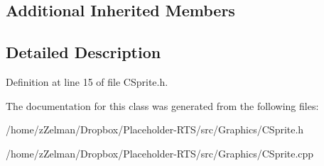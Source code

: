 \subsection*{Additional Inherited Members}


\subsection{Detailed Description}


Definition at line 15 of file C\-Sprite.\-h.



The documentation for this class was generated from the following files\-:\begin{DoxyCompactItemize}
\item 
/home/z\-Zelman/\-Dropbox/\-Placeholder-\/\-R\-T\-S/src/\-Graphics/C\-Sprite.\-h\item 
/home/z\-Zelman/\-Dropbox/\-Placeholder-\/\-R\-T\-S/src/\-Graphics/C\-Sprite.\-cpp\end{DoxyCompactItemize}

